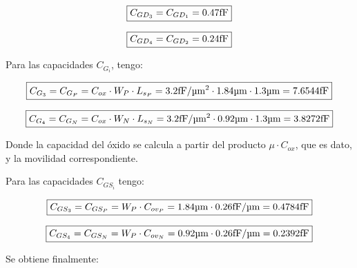 \begin{equation*}
\boxed{ C_{GD_{3}} = C_{GD_{1}} = 0.47 \si[per-mode=symbol]{\femto\farad} }
\end{equation*}


\begin{equation*}
\boxed{ C_{GD_{4}} = C_{GD_{2}} = 0.24 \si[per-mode=symbol]{\femto\farad} }
\end{equation*}



Para las capacidades $C_{G_{i}}$, tengo:

\begin{equation*}
\boxed{ C_{G_{3}} = C_{G_{P}} = C_{ox} \cdot W_{P} \cdot L_{s_{P}} = 3.2 \si[per-mode=symbol]{\femto\farad\per\micro\meter\squared} \cdot 1.84 \si[per-mode=symbol]{\micro\meter} \cdot 1.3 \si[per-mode=symbol]{\micro\meter} = 7.6544 \si[per-mode=symbol]{\femto\farad} }
\end{equation*}


\begin{equation*}
\boxed{ C_{G_{4}} = C_{G_{N}} = C_{ox} \cdot W_{N} \cdot L_{s_{N}} = 3.2 \si[per-mode=symbol]{\femto\farad\per\micro\meter\squared} \cdot 0.92 \si[per-mode=symbol]{\micro\meter} \cdot 1.3 \si[per-mode=symbol]{\micro\meter} = 3.8272 \si[per-mode=symbol]{\femto\farad} }
\end{equation*}



Donde la capacidad del óxido se calcula a partir del producto $\mu \cdot C_{ox}$, que es dato, y la movilidad correspondiente.



Para las capacidades $C_{GS_{i}}$ tengo:


\begin{equation*}
\boxed{ C_{GS_{3}} = C_{GS_{P}} = W_{P} \cdot C_{ov_{P}} = 1.84 \si[per-mode=symbol]{\micro\meter} \cdot 0.26 \si[per-mode=symbol]{\femto\farad\per\micro\meter} = 0.4784 \si[per-mode=symbol]{\femto\farad} }
\end{equation*}


\begin{equation*}
\boxed{ C_{GS_{4}} = C_{GS_{N}} = W_{P} \cdot C_{ov_{N}} = 0.92 \si[per-mode=symbol]{\micro\meter} \cdot 0.26 \si[per-mode=symbol]{\femto\farad\per\micro\meter} = 0.2392 \si[per-mode=symbol]{\femto\farad} }
\end{equation*}





Se obtiene finalmente:


